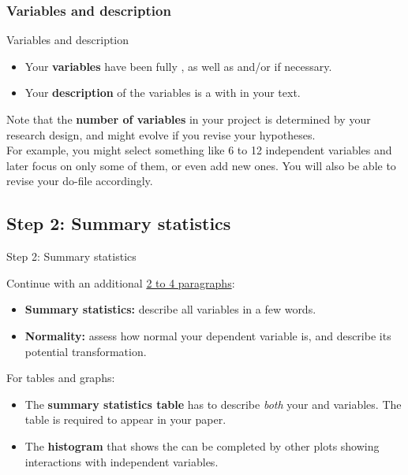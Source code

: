 \documentclass{beamer}
\begin{document}
	\subsubsection{Variables and description}
	
	\begin{frame}[t]{Variables and description}
		
	\begin{itemize}
		\item Your \textbf{variables} have been fully , as well as  and/or  if necessary.
		\item Your \textbf{description} of the variables is a  with  in your text. 
	\end{itemize}
	
	Note that the \textbf{number of variables} in your project is determined by your research design, and might evolve if you revise your hypotheses.\\[1em]
	
	For example, you might select something like 6 to 12 independent variables and later focus on only some of them, or even add new ones. You will also be able to revise your do-file accordingly.
	
	\end{frame}	

	
	
	\subsection{Step 2: Summary statistics}

	\begin{frame}[t]{Step 2: Summary statistics}

	Continue with an additional \underline{2 to 4 paragraphs}:
		
	\begin{itemize}
		\item \textbf{Summary statistics:} describe all variables in a few words.
		\item \textbf{Normality:} assess how normal your dependent variable is, and describe its potential transformation.
	\end{itemize}
	
	For tables and graphs:

	\begin{itemize}
		\item The \textbf{summary statistics table} has to describe \emph{both} your  and  variables. The table is required to appear in your paper.
		
		\item The \textbf{histogram} that shows the  can be completed by other plots showing interactions with independent variables.
	\end{itemize}
	
	\end{frame}
\end{document}
